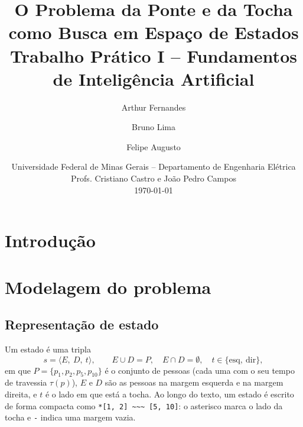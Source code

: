 \documentclass[12pt,a4paper]{article}
\title{\textbf{O Problema da Ponte e da Tocha\\como Busca em Espaço de Estados}\\[0.5em]
       \large Trabalho Prático I -- Fundamentos de Inteligência Artificial}
\author{Arthur Fernandes \and Bruno Lima \and Felipe Augusto
        }
\date{Universidade Federal de Minas Gerais -- Departamento de Engenharia Elétrica\\
      Profs. Cristiano Castro e João Pedro Campos\\[0.5em]
      \today}
\newcommand{\Esq}{E}
\newcommand{\Dir}{D}
\newcommand{\state}[3]{\langle #1,\ #2,\ #3\rangle}
\begin{document}
\maketitle

\begin{abstract}
\end{abstract}

\tableofcontents
\newpage

\section{Introdução}
\label{sec:introducao}

\section{Modelagem do problema}
\label{sec:modelagem}

\subsection{Representação de estado}
\label{sec:estado}

Um estado é uma tripla
\begin{equation}
  s = \state{\Esq}{\Dir}{t},
  \qquad \Esq \cup \Dir = P,\quad \Esq \cap \Dir = \emptyset,\quad t \in \{\text{esq},\ \text{dir}\},
  \label{eq:estado}
\end{equation}
em que $P = \{p_1, p_2, p_5, p_{10}\}$ é o conjunto de pessoas (cada uma com o seu tempo de travessia $\tau(p)$), $\Esq$ e $\Dir$ são as pessoas na margem esquerda e na margem direita, e $t$ é o lado em que está a tocha. Ao longo do texto, um estado é escrito de forma compacta como \texttt{*[1, 2] \textasciitilde{}\textasciitilde{}\textasciitilde{} [5, 10]}: o asterisco marca o lado da tocha e \texttt{-} indica uma margem vazia.
\end{document}

